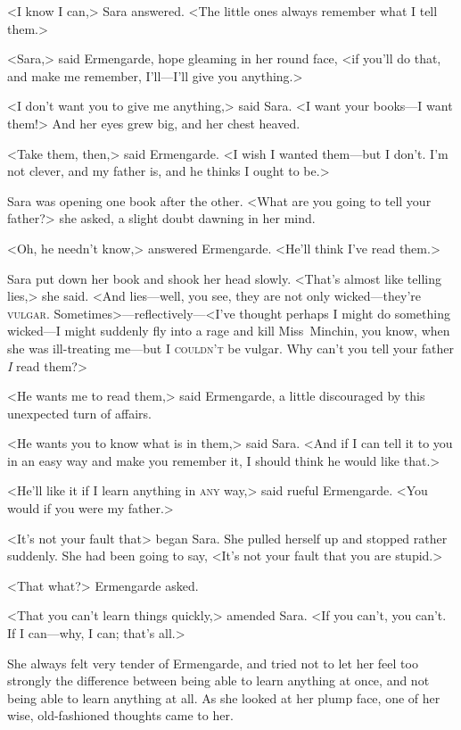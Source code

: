 <I know I can,> Sara answered. <The little ones always remember what I tell them.>

<Sara,> said Ermengarde, hope gleaming in her round face, <if you'll do that, and make me remember, I'll—I'll give you anything.>

<I don't want you to give me anything,> said Sara. <I want your books—I want them!> And her eyes grew big, and her chest heaved.

<Take them, then,> said Ermengarde. <I wish I wanted them—but I don't. I'm not clever, and my father is, and he thinks I ought to be.>

Sara was opening one book after the other. <What are you going to tell your father?> she asked, a slight doubt dawning in her mind.

<Oh, he needn't know,> answered Ermengarde. <He'll think I've read them.>

Sara put down her book and shook her head slowly. <That's almost like telling lies,> she said. <And lies—well, you see, they are not only wicked—they're \textsc{vulgar}. Sometimes>—reflectively—<I've thought perhaps I might do something wicked—I might suddenly fly into a rage and kill Miss~Minchin, you know, when she was ill-treating me—but I \textsc{couldn't} be vulgar. Why can't you tell your father \textit{I} read them?>

<He wants me to read them,> said Ermengarde, a little discouraged by this unexpected turn of affairs.

<He wants you to know what is in them,> said Sara. <And if I can tell it to you in an easy way and make you remember it, I should think he would like that.>

<He'll like it if I learn anything in \textsc{any} way,> said rueful Ermengarde. <You would if you were my father.>

<It's not your fault that\longdash> began Sara. She pulled herself up and stopped rather suddenly. She had been going to say, <It's not your fault that you are stupid.>

<That what?> Ermengarde asked.

<That you can't learn things quickly,> amended Sara. <If you can't, you can't. If I can—why, I can; that's all.>

She always felt very tender of Ermengarde, and tried not to let her feel too strongly the difference between being able to learn anything at once, and not being able to learn anything at all. As she looked at her plump face, one of her wise, old-fashioned thoughts came to her.


